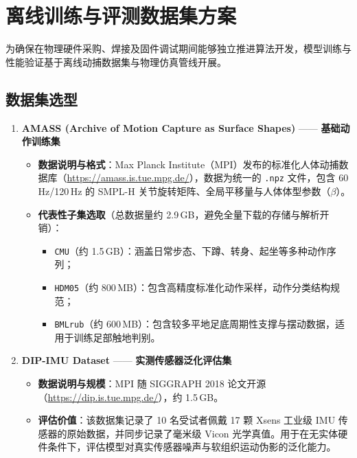 \documentclass[UTF8,11pt,a4paper]{ctexart}
\begin{document}
\section{离线训练与评测数据集方案}
\label{sec:datasets}

为确保在物理硬件采购、焊接及固件调试期间能够独立推进算法开发，模型训练与性能验证基于离线动捕数据集与物理仿真管线开展。

\subsection{数据集选型}

\begin{enumerate}
    \item \textbf{AMASS (Archive of Motion Capture as Surface Shapes)} —— \textbf{基础动作训练集}
    \begin{itemize}
        \item \textbf{数据说明与格式}：Max Planck Institute（MPI）发布的标准化人体动捕数据库（\url{https://amass.is.tue.mpg.de/}），数据为统一的 \texttt{.npz} 文件，包含 60\,Hz/120\,Hz 的 SMPL-H 关节旋转矩阵、全局平移量与人体体型参数（$\beta$）。
        \item \textbf{代表性子集选取}（总数据量约 2.9\,GB，避免全量下载的存储与解析开销）：
        \begin{itemize}
            \item \texttt{CMU}（约 1.5\,GB）：涵盖日常步态、下蹲、转身、起坐等多种动作序列；
            \item \texttt{HDM05}（约 800\,MB）：包含高精度标准化动作采样，动作分类结构规范；
            \item \texttt{BMLrub}（约 600\,MB）：包含较多平地足底周期性支撑与摆动数据，适用于训练足部触地判别。
        \end{itemize}
    \end{itemize}

    \item \textbf{DIP-IMU Dataset} —— \textbf{实测传感器泛化评估集}
    \begin{itemize}
        \item \textbf{数据说明与规模}：MPI 随 SIGGRAPH 2018 论文开源（\url{https://dip.is.tue.mpg.de/}），约 1.5\,GB。
        \item \textbf{评估价值}：该数据集记录了 10 名受试者佩戴 17 颗 Xsens 工业级 IMU 传感器的原始数据，并同步记录了毫米级 Vicon 光学真值。用于在无实体硬件条件下，评估模型对真实传感器噪声与软组织运动伪影的泛化能力。
    \end{itemize}
\end{enumerate}
\end{document}
